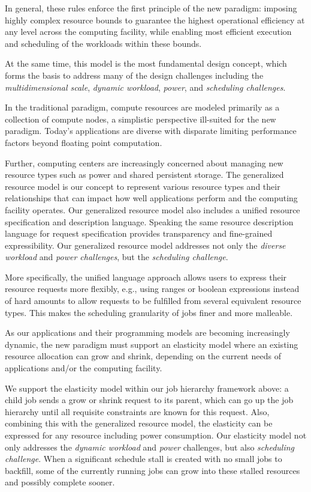 In general, these rules enforce the first principle 
of the new paradigm: imposing highly complex resource bounds 
to guarantee the highest operational efficiency 
at any level across the computing facility, while enabling 
most efficient execution and scheduling of the workloads 
within these bounds. 

At the same time, this model is the most fundamental 
design concept, which forms the basis to address 
many of the design challenges including 
the {\em multidimensional scale}, {\em dynamic workload}, 
{\em power}, and {\em scheduling challenges}.

\vspace{1ex}
 In the traditional 
paradigm, compute resources are modeled primarily 
as a collection of compute nodes, a simplistic perspective 
ill-suited for the new paradigm. Today's applications 
are diverse with disparate limiting performance factors 
beyond floating point computation. 

Further, computing centers are increasingly concerned 
about managing new resource types such as power 
and shared persistent storage. The generalized resource 
model is our concept to represent various resource types 
and their relationships that can impact how well applications 
perform and the computing facility operates. 
Our generalized resource model also includes a unified 
resource specification and description language. 
Speaking the same resource description language 
for request specification provides transparency and 
fine-grained expressibility. Our generalized resource 
model addresses not only the {\em diverse workload} 
and {\em power challenges}, but the {\em scheduling challenge}.

More specifically, the unified language approach 
allows users to express their resource requests 
more flexibly, e.g., using ranges or boolean 
expressions instead of hard amounts to allow requests 
to be fulfilled from several equivalent resource types. 
This makes the scheduling granularity 
of jobs finer and more malleable.

\vspace{1ex}
 As our 
applications and their programming models are becoming 
increasingly dynamic, the new paradigm must support 
an elasticity model where an existing resource allocation 
can grow and shrink, depending on the current needs 
of applications and/or the computing facility. 

We support the elasticity model within our job hierarchy 
framework above: a child job sends a grow or shrink request 
to its parent, which can go up the job hierarchy 
until all requisite constraints are known for this request. 
Also, combining this with the generalized resource model, 
the elasticity can be expressed for any resource including 
power consumption. Our elasticity model not only addresses 
the {\em dynamic workload} and {\em power} challenges, but also 
{\em scheduling challenge}. When a significant schedule stall 
is created with no small jobs to backfill, some of the 
currently running jobs can grow into these stalled 
resources and possibly complete sooner.

